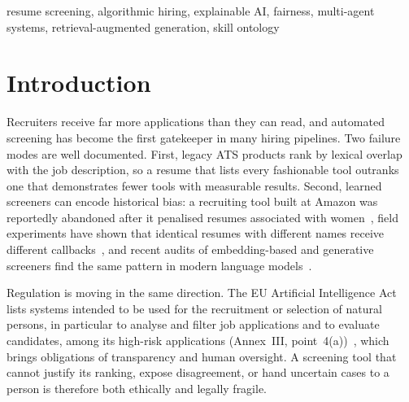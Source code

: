 \documentclass[conference]{IEEEtran}
\begin{document}
\begin{IEEEkeywords}
resume screening, algorithmic hiring, explainable AI, fairness, multi-agent systems, retrieval-augmented generation, skill ontology
\end{IEEEkeywords}

\section{Introduction}
Recruiters receive far more applications than they can read, and automated screening has become the first gatekeeper in many hiring pipelines. Two failure modes are well documented. First, legacy ATS products rank by lexical overlap with the job description, so a resume that lists every fashionable tool outranks one that demonstrates fewer tools with measurable results. Second, learned screeners can encode historical bias: a recruiting tool built at Amazon was reportedly abandoned after it penalised resumes associated with women~\cite{dastin}, field experiments have shown that identical resumes with different names receive different callbacks~\cite{bertrand}, and recent audits of embedding-based and generative screeners find the same pattern in modern language models~\cite{wilson,armstrong}.

Regulation is moving in the same direction. The EU Artificial Intelligence Act lists systems intended to be used for the recruitment or selection of natural persons, in particular to analyse and filter job applications and to evaluate candidates, among its high-risk applications (Annex~III, point~4(a))~\cite{euai}, which brings obligations of transparency and human oversight. A screening tool that cannot justify its ranking, expose disagreement, or hand uncertain cases to a person is therefore both ethically and legally fragile.
\end{document}

